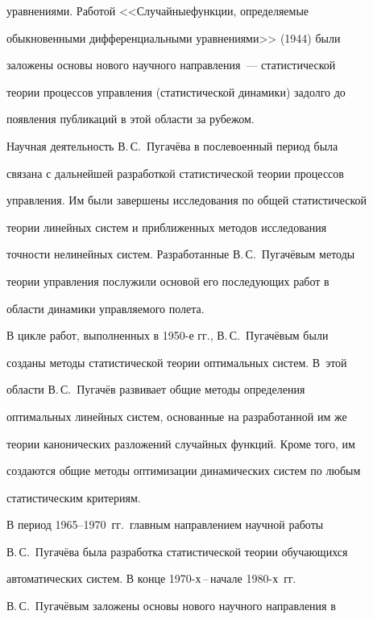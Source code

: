уравнениями. Работой <<Случайные\linebreak функции, определяемые 


обыкновенными дифференциальными уравнениями>> (1944) были 


заложены основы нового научного на\-прав\-ле\-ния~--- статистической 


теории процессов управления (статистической динамики) задолго до 


появления публикаций в этой области за рубежом.


    


    Научная деятельность В.\,С.~Пугачёва в послевоенный период была 


связана с дальнейшей разработкой статистической теории процессов 


управления. Им были завершены исследования по общей статистической 


теории линейных систем и приближенных методов исследования 


точности нелинейных систем. Разработанные В.\,С.~Пугачёвым методы 


теории управления послужили основой его последующих работ в 


области динамики управляемого полета.


    


    В цикле работ, выполненных в 1950-е гг., В.\,С.~Пугачёвым были 


созданы методы статистической теории оптимальных систем. В~этой 


области В.\,С.~Пугачёв развивает общие методы определения 


оптимальных линейных систем, основанные на разработанной им же 


теории канонических разложений случайных функций. Кроме того, им 


создаются общие методы оптимизации динамических систем по любым 


статистическим критериям. 


    


    В период 1965--1970~гг.\ главным направлением научной работы 


В.\,С.~Пугачёва была разработка статистической теории обучающихся 


автоматических систем. В конце 1970-х\,--\,начале 1980-х~гг.\ 


В.\,С.~Пугачёвым заложены основы нового научного направления в 


